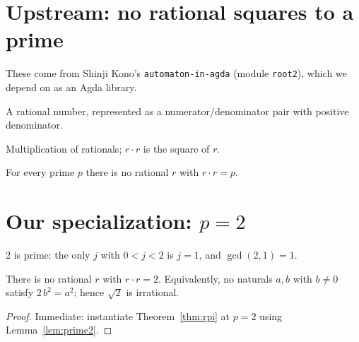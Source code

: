 
\section{Upstream: no rational squares to a prime}

These come from Shinji Kono's \texttt{automaton-in-agda} (module \texttt{root2}),
which we depend on as an Agda library.

\begin{definition}[Rational]\label{def:rational}
  \stdlibok
  A rational number, represented as a numerator/denominator pair with positive
  denominator.
\end{definition}

\begin{definition}\label{def:rational-mul}
  \stdlibok
  Multiplication of rationals; $r \cdot r$ is the square of $r$.
\end{definition}

\begin{theorem}\label{thm:rpi}
  \stdlibok
  For every prime $p$ there is no rational $r$ with $r \cdot r = p$.
\end{theorem}

\section{Our specialization: $p = 2$}

\begin{lemma}[$2$ is prime]\label{lem:prime2}
  \agdaok
  $2$ is prime: the only $j$ with $0 < j < 2$ is $j = 1$, and $\gcd(2,1) = 1$.
\end{lemma}

\begin{theorem}\label{thm:sqrt2}
  \agdaok
  There is no rational $r$ with $r \cdot r = 2$. Equivalently, no naturals
  $a, b$ with $b \neq 0$ satisfy $2\,b^2 = a^2$; hence $\sqrt{2}$ is irrational.
\end{theorem}

\begin{proof}
  Immediate: instantiate Theorem~\ref{thm:rpi} at $p = 2$ using
  Lemma~\ref{lem:prime2}.
\end{proof}
